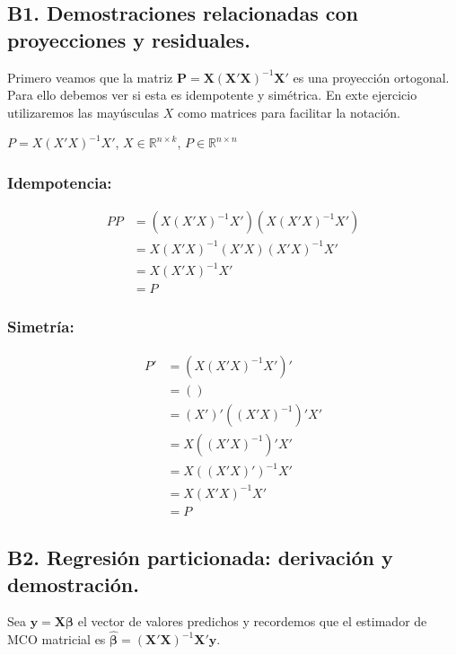 \documentclass[12pt, letter]{article}
\begin{document}
\subsection{B1. Demostraciones relacionadas con proyecciones y residuales.}

Primero veamos que la matriz $\textbf{P} = \textbf{X}(\textbf{X}'\textbf{X})^{-1}\textbf{X}'$ es una proyección ortogonal. Para ello debemos ver si esta es idempotente y simétrica. En exte ejercicio utilizaremos las mayúsculas $X$ como matrices para facilitar la notación. 



\( P = X (X'X)^{-1} X' \), \quad \( X \in \mathbb{R}^{n \times k} \), \quad \( P \in \mathbb{R}^{n \times n} \)

\subsubsection*{Idempotencia:}
\begin{align*}
P P &= \left( X (X'X)^{-1} X' \right) \left( X (X'X)^{-1} X' \right) \\
    &= X (X'X)^{-1} (X'X) (X'X)^{-1} X' \\
    &= X (X'X)^{-1} X' \\
    &= P
\end{align*}

\subsubsection*{Simetría:}
\begin{align*}
P' &= \left( X (X'X)^{-1} X' \right)' \\
   &= \left(  \right) \\
   &= \left( X' \right)' \left( (X'X)^{-1} \right)' X' \\
   &= X \left( (X'X)^{-1} \right)' X' \\
   &= X \left( (X'X)' \right)^{-1} X' \\
   &= X \left( X'X \right)^{-1} X' \\
   &= P
\end{align*}


\subsection{B2. Regresión particionada: derivación y demostración.}


Sea $\boldsymbol{y} = \boldsymbol{X}\boldsymbol{\beta}$ el vector de valores predichos y recordemos que el estimador de MCO matricial es $\boldsymbol{\hat{\beta}} = (\boldsymbol{X}'\boldsymbol{X})^{-1}\boldsymbol{X}'\boldsymbol{y}$. 
\end{document}
